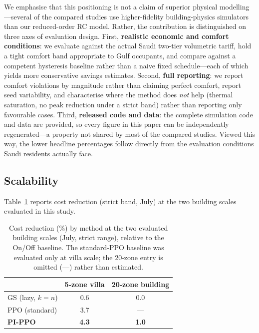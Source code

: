 \documentclass[12pt,a4paper]{article}
\begin{document}
We emphasise that this positioning is not a claim of superior physical modelling---several of the compared studies use higher-fidelity building-physics simulators than our reduced-order RC model. Rather, the contribution is distinguished on three axes of evaluation design. First, \textbf{realistic economic and comfort conditions}: we evaluate against the actual Saudi two-tier volumetric tariff, hold a tight comfort band appropriate to Gulf occupants, and compare against a competent hysteresis baseline rather than a naive fixed schedule---each of which yields more conservative savings estimates. Second, \textbf{full reporting}: we report comfort violations by magnitude rather than claiming perfect comfort, report seed variability, and characterise where the method does \emph{not} help (thermal saturation, no peak reduction under a strict band) rather than reporting only favourable cases. Third, \textbf{released code and data}: the complete simulation code and data are provided, so every figure in this paper can be independently regenerated---a property not shared by most of the compared studies. Viewed this way, the lower headline percentages follow directly from the evaluation conditions Saudi residents actually face.

\subsection{Scalability}

Table~\ref{tab:scale} reports cost reduction (strict band, July) at the two building scales evaluated in this study.

\begin{table}[H]
\centering
\caption{Cost reduction (\%) by method at the two evaluated building scales (July, strict range), relative to the On/Off baseline. The standard-PPO baseline was evaluated only at villa scale; the 20-zone entry is omitted (---) rather than estimated.}
\label{tab:scale}
\begin{tabular*}{\textwidth}{@{\extracolsep{\fill}}lcc@{}}
\toprule
& \textbf{5-zone villa} & \textbf{20-zone building} \\
\midrule
GS (lazy, $k=n$) & 0.6 & 0.0 \\
PPO (standard) & 3.7 & --- \\
\textbf{PI-PPO} & \textbf{4.3} & \textbf{1.0} \\
\bottomrule
\end{tabular*}
\end{table}
\end{document}
